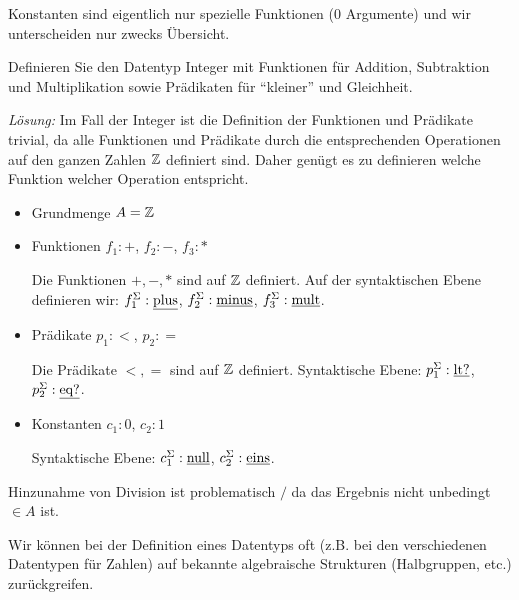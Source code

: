 Konstanten sind eigentlich nur spezielle Funktionen ($0$ Argumente) und wir unterscheiden nur zwecks Übersicht.
\begin{bsp}
Definieren Sie den Datentyp Integer mit Funktionen für Addition, Subtraktion und Multiplikation sowie Prädikaten für
``kleiner'' und Gleichheit.

\textit{Lösung:}
Im Fall der Integer ist die Definition der Funktionen und Prädikate trivial, da
alle Funktionen und Prädikate durch die entsprechenden Operationen auf den ganzen Zahlen $\mathbb{Z}$ definiert sind.
Daher genügt es zu definieren welche Funktion welcher Operation entspricht.
\begin{itemize}\label{defn:integer}
\item Grundmenge $A=\mathbb{Z}$
\item Funktionen $f_1: +$, $f_2: -$, $f_3: *$

Die Funktionen $+, -, *$ sind auf $\mathbb{Z}$ definiert.
Auf der syntaktischen Ebene definieren wir: $f^{\Sigma}_1: \underline{\operatorname*{plus}}$, $f^{\Sigma}_2: \underline{\operatorname*{minus}}$, $f^{\Sigma}_3: \underline{\operatorname*{mult}}$.
\item Prädikate $p_1: <$, $p_2: =$

Die Prädikate $<, =$ sind auf $\mathbb{Z}$ definiert.
Syntaktische Ebene: $p^{\Sigma}_1: \underline{\operatorname*{lt?}}$, $p^{\Sigma}_2: \underline{\operatorname*{eq?}}$.
\item Konstanten $c_1: 0$, $c_2: 1$

Syntaktische Ebene: $c^{\Sigma}_1: \underline{\operatorname*{null}}$, $c^{\Sigma}_2: \underline{\operatorname*{eins}}$.
\end{itemize}
Hinzunahme von Division ist problematisch $/$ da das Ergebnis nicht unbedingt $\in A$ ist.
\end{bsp}
Wir können bei der Definition eines Datentyps oft (z.B. bei den verschiedenen Datentypen für Zahlen) auf bekannte algebraische Strukturen (Halbgruppen, etc.) zurückgreifen.
